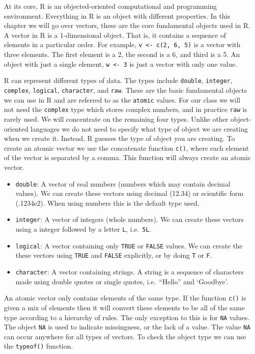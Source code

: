 \documentclass[
]{book}
\begin{document}
At its core, R is an objected-oriented computational and programming environment. Everything in R is an object with different properties. In this chapter we will go over vectors, these are the core fundamental objects used in R. A vector in R is a 1-dimensional object. That is, it contains a sequence of elements in a particular order. For example, \texttt{v\ \textless{}-\ c(2,\ 6,\ 5)} is a vector with three elements. The first element is a 2, the second is a 6, and third is a 5. An object with just a single element, \texttt{w\ \textless{}-\ 3} is just a vector with only one value.

R can represent different types of data. The types include \texttt{double}, \texttt{integer}, \texttt{complex}, \texttt{logical}, \texttt{character}, and \texttt{raw}. These are the basic fundamental objects we can use in R and are referred to as the \texttt{atomic} values. For our class we will not need the \texttt{complex} type which stores complex numbers, and in practice \texttt{raw} is rarely used. We will concentrate on the remaining four types. Unlike other object-oriented languages we do not need to specify what type of object we are creating when we create it. Instead, R guesses the type of object you are creating. To create an atomic vector we use the concatenate function \texttt{c()}, where each element of the vector is separated by a comma. This function will always create an atomic vector.

\begin{itemize}
\item
  \texttt{double}: A vector of real numbers (numbers which may contain decimal values). We can create these vectors using decimal (12.34) or scientific form (.1234e2). When using numbers this is the default type used.
\item
  \texttt{integer}: A vector of integers (whole numbers). We can create these vectors using a integer followed by a letter \texttt{L}, i.e.~\texttt{5L}.
\item
  \texttt{logical}: A vector containing only \texttt{TRUE} or \texttt{FALSE} values. We can create the these vectors using \texttt{TRUE} and \texttt{FALSE} explicitly, or by doing \texttt{T} or \texttt{F}.
\item
  \texttt{character}: A vector containing strings. A string is a sequence of characters made using double quotes or single quotes, i.e.~``Hello'' and `Goodbye'.
\end{itemize}

An atomic vector only contains elements of the same type. If the function \texttt{c()} is given a mix of elements then it will convert these elements to be all of the same type according to a hierarchy of rules. The only exception to this is for \texttt{NA} values. The object \texttt{NA} is used to indicate missingness, or the lack of a value. The value \texttt{NA} can occur anywhere for all types of vectors. To check the object type we can use the \texttt{typeof()} function.
\end{document}
